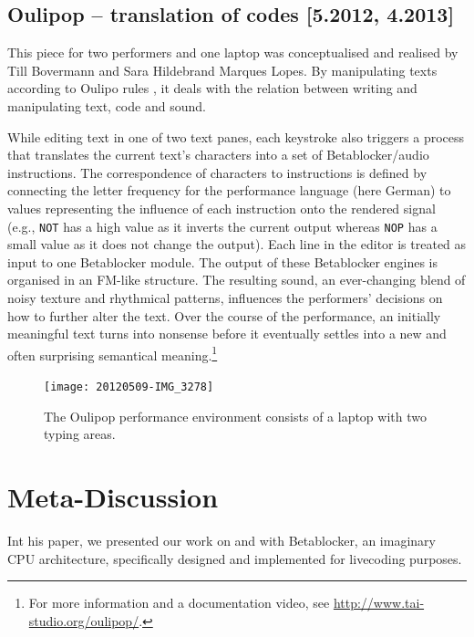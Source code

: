 \documentclass[letterpaper, 12pt]{article}
\begin{document}
\parskip 18pt

\subsection{Oulipop -- translation of codes [5.2012, 4.2013]}
\label{sub:oulipop}

This piece for two performers and one laptop was conceptualised and realised by Till Bovermann and Sara Hildebrand Marques Lopes.
By manipulating texts according to Oulipo rules \citep*{mathews2005-oul}, it deals with the relation between writing and manipulating text, code and sound.

While editing text in one of two text panes, each keystroke also triggers a process that translates the current text's characters into a set of Betablocker/audio instructions. 
The correspondence of characters to instructions is defined by connecting the letter frequency for the performance language (here German) to values representing the influence of each instruction onto the rendered signal (e.g., \texttt{NOT} has a high value as it inverts the current output whereas \texttt{NOP} has a small value as it does not change the output).
Each line in the editor is treated as input to one Betablocker module.
The output of these Betablocker engines is organised in an FM-like structure. 
The resulting sound, an ever-changing blend of noisy texture and rhythmical patterns, influences the performers' decisions on how to further alter the text. 
Over the course of the performance, an initially meaningful text turns into nonsense before it eventually settles into a new and often surprising semantical meaning.\footnote{For more information and a documentation video, see \url{http://www.tai-studio.org/oulipop/}.}
\begin{figure}
	\centering
		\texttt{[image: 20120509-IMG\_3278]}
	\caption{The Oulipop performance environment consists of a laptop with two typing areas.}
	\label{fig:fig_20120509-IMG_3278}
\end{figure}

\parskip 18pt

\section{Meta-Discussion}
\label{sec:meta}

Int his paper, we presented our work on and with Betablocker, an imaginary CPU architecture, specifically designed and implemented for livecoding purposes.
\end{document}
